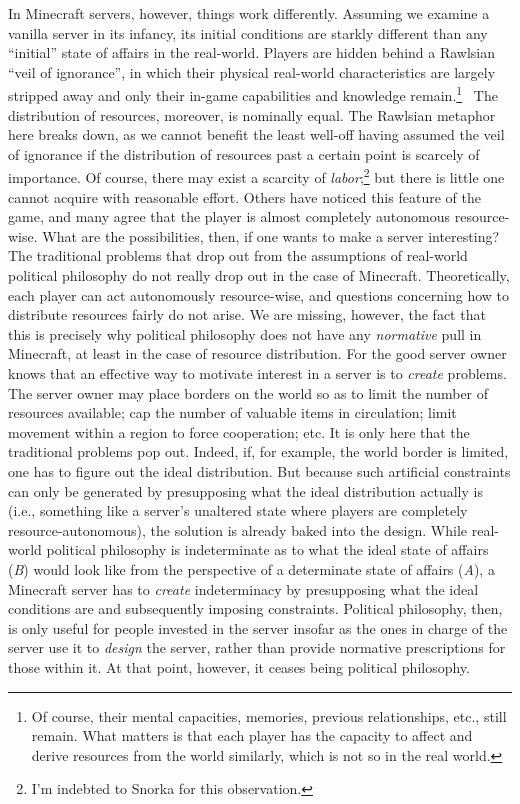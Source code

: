 In Minecraft servers, however, things work differently. Assuming we examine a vanilla server in its infancy, its initial conditions are starkly different than any “initial” state of affairs in the real-world. Players are hidden behind a Rawlsian “veil of ignorance”, in which their physical real-world characteristics are largely stripped away and only their in-game capabilities and knowledge remain.\footnote{Of course, their mental capacities, memories, previous relationships, etc., still remain. What matters is that each player has the capacity to affect and derive resources from the world similarly, which is not so in the real world.}~\citep[p.~10]{Rawls(1971)} The distribution of resources, moreover, is nominally equal. The Rawlsian metaphor here breaks down, as we cannot benefit the least well-off having assumed the veil of ignorance if the distribution of resources past a certain point is scarcely of importance. Of course, there may exist a scarcity of \emph{labor};\footnote{I'm indebted to Snorka for this observation.} but there is little one cannot acquire with reasonable effort. Others have noticed this feature of the game, and many agree that the player is almost completely autonomous resource-wise. What are the possibilities, then, if one wants to make a server interesting? The traditional problems that drop out from the assumptions of real-world political philosophy do not really drop out in the case of Minecraft. Theoretically, each player can act autonomously resource-wise, and questions concerning how to distribute resources fairly do not arise. We are missing, however, the fact that this is precisely why political philosophy does not have any \emph{normative} pull in Minecraft, at least in the case of resource distribution. For the good server owner knows that an effective way to motivate interest in a server is to \emph{create} problems. The server owner may place borders on the world so as to limit the number of resources available; cap the number of valuable items in circulation; limit movement within a region to force cooperation; etc. It is only here that the traditional problems pop out. Indeed, if, for example, the world border is limited, one has to figure out the ideal distribution. But because such artificial constraints can only be generated by presupposing what the ideal distribution actually is (i.e., something like a server’s unaltered state where players are completely resource-autonomous), the solution is already baked into the design. While real-world political philosophy is indeterminate as to what the ideal state of affairs (\emph{B}) would look like from the perspective of a determinate state of affairs (\emph{A}), a Minecraft server has to \emph{create} indeterminacy by presupposing what the ideal conditions are and subsequently imposing constraints. Political philosophy, then, is only useful for people invested in the server insofar as the ones in charge of the server use it to \emph{design} the server, rather than provide normative prescriptions for those within it. At that point, however, it ceases being political philosophy.

